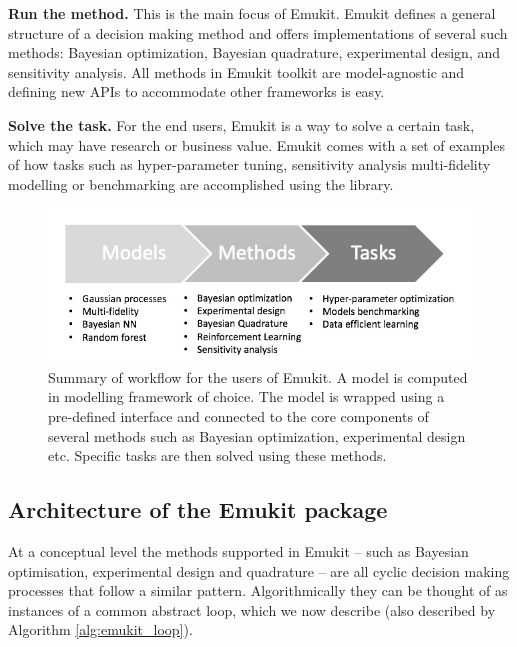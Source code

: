 \textbf{Run the method.} This is the main focus of Emukit. Emukit defines a general structure of a decision making method and offers implementations of several such methods: Bayesian optimization, Bayesian quadrature, experimental design, and sensitivity analysis. All methods in Emukit toolkit are model-agnostic and defining new APIs to accommodate other frameworks is easy.

\textbf{Solve the task.} For the end users, Emukit is a way to solve a certain task, which may have research or business value. Emukit comes with a set of examples of how tasks such as hyper-parameter tuning, sensitivity analysis multi-fidelity modelling or benchmarking are accomplished using the library.

\begin{figure}[h]
    \centering
      \includegraphics[scale=0.4]{workflow.png}  
    \caption{Summary of workflow for the users of Emukit. A model is computed in modelling framework of choice. The model is wrapped using a pre-defined interface and connected to the core components of several methods such as Bayesian optimization, experimental design etc. Specific tasks are then solved using these methods.}
    \label{figure:workflow}
\end{figure}

\subsection{Architecture of the Emukit package}

At a conceptual level the methods supported in Emukit -- such as Bayesian optimisation, experimental design and quadrature -- are all cyclic decision making processes that follow a similar pattern. 
Algorithmically they can be thought of as instances of a common abstract loop, which we now describe (also described by Algorithm \ref{alg:emukit_loop}).

